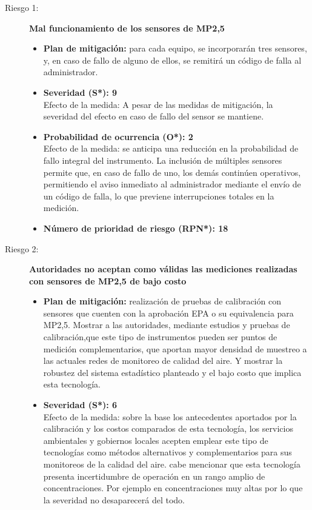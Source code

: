 \begin{description}
	\item[Riesgo 1:]\textbf{Mal funcionamiento de los sensores de MP2,5}
		\begin{itemize}
			\item \textbf{Plan de mitigación:} para cada equipo, se incorporarán tres sensores, y, en caso de fallo de alguno de ellos, se remitirá un código de falla al administrador.
			\item \textbf{Severidad (S*): 9} \\
			Efecto de la medida: A pesar de las medidas de mitigación, la severidad del efecto en caso de fallo del sensor se mantiene.
			\item \textbf{Probabilidad de ocurrencia (O*): 2} \\
			Efecto de la medida: se anticipa una reducción en la probabilidad de fallo integral del instrumento. La inclusión de múltiples sensores permite que, en caso de fallo de uno, los demás continúen operativos, permitiendo el aviso inmediato al administrador mediante el envío de un código de falla, lo que previene interrupciones totales en la medición.
			\item \textbf{Número de prioridad de riesgo (RPN*): 18} 
		\end{itemize}
	


    \item[Riesgo 2:] \textbf{Autoridades no aceptan como válidas las mediciones realizadas con sensores de MP2,5 de bajo costo}   	 
		\begin{itemize}
			
			\item \textbf{Plan de mitigación:} realización de pruebas de calibración con sensores que cuenten con la aprobación EPA o su equivalencia para MP2,5. Mostrar a las autoridades, mediante estudios y pruebas de calibración,que este tipo de instrumentos pueden ser puntos de medición complementarios, que aportan mayor densidad  de muestreo a las actuales redes de monitoreo de calidad del aire. Y mostrar la robustez del sistema estadístico planteado y el bajo costo que implica esta tecnología.   
			\item \textbf{Severidad (S*): 6} \\
			Efecto de la medida: sobre la base los antecedentes aportados por la calibración y los costos comparados de esta tecnología, los servicios ambientales y gobiernos locales acepten emplear este tipo de tecnologías como métodos alternativos y complementarios para sus monitoreos de la calidad del aire. cabe mencionar que esta tecnología presenta incertidumbre de operación en un rango amplio de concentraciones. Por ejemplo en concentraciones muy altas por lo que la severidad no desaparecerá del todo.
	

\end{itemize}
\end{description}
